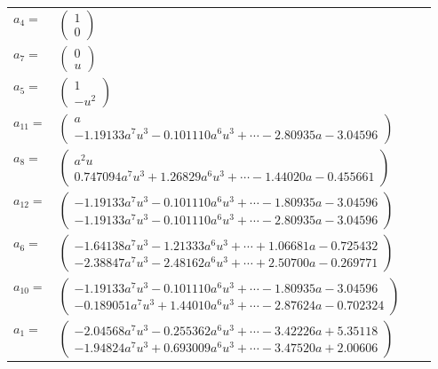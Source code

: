 \documentclass[1p]{elsarticle_modified}
\theoremstyle{definition}
\begin{document}
\begin{tabular}{m{7pt} m{180pt} m{7pt} m{180pt} }
\flushright $a_{4}=$&$\begin{pmatrix}1\\0\end{pmatrix}$ \\
\flushright $a_{7}=$&$\begin{pmatrix}0\\u\end{pmatrix}$ \\
\flushright $a_{5}=$&$\begin{pmatrix}1\\- u^2\end{pmatrix}$ \\
\flushright $a_{11}=$&$\begin{pmatrix}a\\-1.19133 a^{7} u^{3}-0.101110 a^{6} u^{3}+\cdots-2.80935 a-3.04596\end{pmatrix}$ \\
\flushright $a_{8}=$&$\begin{pmatrix}a^2 u\\0.747094 a^{7} u^{3}+1.26829 a^{6} u^{3}+\cdots-1.44020 a-0.455661\end{pmatrix}$ \\
\flushright $a_{12}=$&$\begin{pmatrix}-1.19133 a^{7} u^{3}-0.101110 a^{6} u^{3}+\cdots-1.80935 a-3.04596\\-1.19133 a^{7} u^{3}-0.101110 a^{6} u^{3}+\cdots-2.80935 a-3.04596\end{pmatrix}$ \\
\flushright $a_{6}=$&$\begin{pmatrix}-1.64138 a^{7} u^{3}-1.21333 a^{6} u^{3}+\cdots+1.06681 a-0.725432\\-2.38847 a^{7} u^{3}-2.48162 a^{6} u^{3}+\cdots+2.50700 a-0.269771\end{pmatrix}$ \\
\flushright $a_{10}=$&$\begin{pmatrix}-1.19133 a^{7} u^{3}-0.101110 a^{6} u^{3}+\cdots-1.80935 a-3.04596\\-0.189051 a^{7} u^{3}+1.44010 a^{6} u^{3}+\cdots-2.87624 a-0.702324\end{pmatrix}$ \\
\flushright $a_{1}=$&$\begin{pmatrix}-2.04568 a^{7} u^{3}-0.255362 a^{6} u^{3}+\cdots-3.42226 a+5.35118\\-1.94824 a^{7} u^{3}+0.693009 a^{6} u^{3}+\cdots-3.47520 a+2.00606\end{pmatrix}$ \\

\end{tabular}
\end{document}
